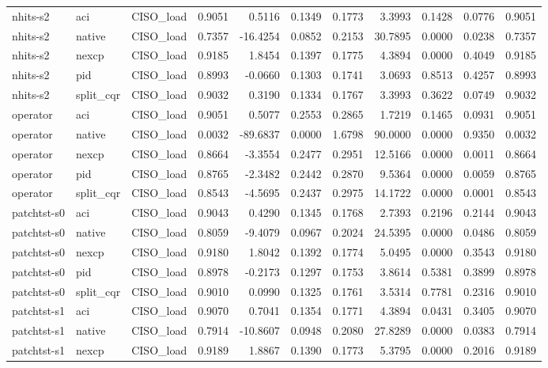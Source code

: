 \begin{tabular}{lllrrrrrrrr}
nhits-s2 & aci & CISO_load & 0.9051 & 0.5116 & 0.1349 & 0.1773 & 3.3993 & 0.1428 & 0.0776 & 0.9051 \\
nhits-s2 & native & CISO_load & 0.7357 & -16.4254 & 0.0852 & 0.2153 & 30.7895 & 0.0000 & 0.0238 & 0.7357 \\
nhits-s2 & nexcp & CISO_load & 0.9185 & 1.8454 & 0.1397 & 0.1775 & 4.3894 & 0.0000 & 0.4049 & 0.9185 \\
nhits-s2 & pid & CISO_load & 0.8993 & -0.0660 & 0.1303 & 0.1741 & 3.0693 & 0.8513 & 0.4257 & 0.8993 \\
nhits-s2 & split_cqr & CISO_load & 0.9032 & 0.3190 & 0.1334 & 0.1767 & 3.3993 & 0.3622 & 0.0749 & 0.9032 \\
operator & aci & CISO_load & 0.9051 & 0.5077 & 0.2553 & 0.2865 & 1.7219 & 0.1465 & 0.0931 & 0.9051 \\
operator & native & CISO_load & 0.0032 & -89.6837 & 0.0000 & 1.6798 & 90.0000 & 0.0000 & 0.9350 & 0.0032 \\
operator & nexcp & CISO_load & 0.8664 & -3.3554 & 0.2477 & 0.2951 & 12.5166 & 0.0000 & 0.0011 & 0.8664 \\
operator & pid & CISO_load & 0.8765 & -2.3482 & 0.2442 & 0.2870 & 9.5364 & 0.0000 & 0.0059 & 0.8765 \\
operator & split_cqr & CISO_load & 0.8543 & -4.5695 & 0.2437 & 0.2975 & 14.1722 & 0.0000 & 0.0001 & 0.8543 \\
patchtst-s0 & aci & CISO_load & 0.9043 & 0.4290 & 0.1345 & 0.1768 & 2.7393 & 0.2196 & 0.2144 & 0.9043 \\
patchtst-s0 & native & CISO_load & 0.8059 & -9.4079 & 0.0967 & 0.2024 & 24.5395 & 0.0000 & 0.0486 & 0.8059 \\
patchtst-s0 & nexcp & CISO_load & 0.9180 & 1.8042 & 0.1392 & 0.1774 & 5.0495 & 0.0000 & 0.3543 & 0.9180 \\
patchtst-s0 & pid & CISO_load & 0.8978 & -0.2173 & 0.1297 & 0.1753 & 3.8614 & 0.5381 & 0.3899 & 0.8978 \\
patchtst-s0 & split_cqr & CISO_load & 0.9010 & 0.0990 & 0.1325 & 0.1761 & 3.5314 & 0.7781 & 0.2316 & 0.9010 \\
patchtst-s1 & aci & CISO_load & 0.9070 & 0.7041 & 0.1354 & 0.1771 & 4.3894 & 0.0431 & 0.3405 & 0.9070 \\
patchtst-s1 & native & CISO_load & 0.7914 & -10.8607 & 0.0948 & 0.2080 & 27.8289 & 0.0000 & 0.0383 & 0.7914 \\
patchtst-s1 & nexcp & CISO_load & 0.9189 & 1.8867 & 0.1390 & 0.1773 & 5.3795 & 0.0000 & 0.2016 & 0.9189 \\

\end{tabular}
